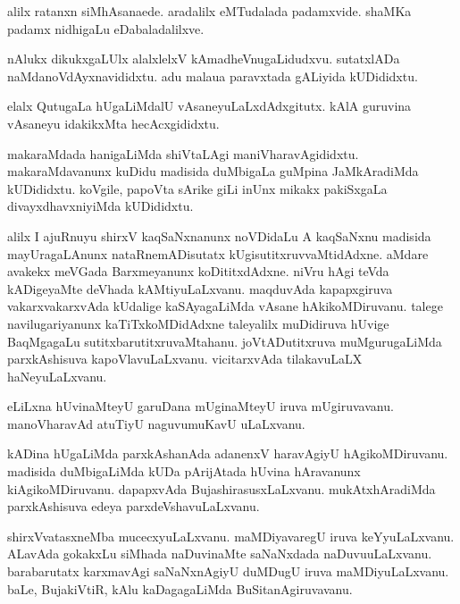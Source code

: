 \documentclass{article}
\begin{document}
\begin{mn}%
alilx ratanxn siMhAsanaede. aradalilx  eMTudalada padamxvide. shaMKa padamx nidhigaLu 
eDabaladalilxve.
\end{mn}

\begin{mn}%
nAlukx dikukxgaLUlx alalxlelxV kAmadheVnugaLidudxvu. sutatxlADa naMdanoVdAyxnavididxtu. 
adu malaua paravxtada gALiyida kUDididxtu.
\end{mn}

\begin{mn}%
elalx QutugaLa hUgaLiMdalU vAsaneyuLaLxdAdxgitutx. kAlA guruvina vAsaneyu idakikxMta 
hecAcxgididxtu.
\end{mn}

\begin{mn}%
makaraMdada hanigaLiMda shiVtaLAgi maniVharavAgididxtu. makaraMdavanunx kuDidu madisida 
duMbigaLa guMpina JaMkAradiMda kUDididxtu. koVgile, papoVta sArike giLi inUnx mikakx 
pakiSxgaLa divayxdhavxniyiMda kUDididxtu.
\end{mn}

\begin{mn}%
alilx I ajuRnuyu shirxV kaqSaNxnanunx noVDidaLu A kaqSaNxnu madisida mayUragaLAnunx 
nataRnemADisutatx kUgisutitxruvvaMtidAdxne. aMdare avakekx meVGada Barxmeyanunx 
koDititxdAdxne. niVru hAgi teVda kADigeyaMte deVhada kAMtiyuLaLxvanu. maqduvAda 
kapapxgiruva vakarxvakarxvAda kUdalige kaSAyagaLiMda vAsane hAkikoMDiruvanu. talege 
navilugariyanunx kaTiTxkoMDidAdxne taleyalilx muDidiruva hUvige BaqMgagaLu 
sutitxbarutitxruvaMtahanu. joVtADutitxruva muMgurugaLiMda parxkAshisuva kapoVlavuLaLxvanu. 
vicitarxvAda tilakavuLaLX haNeyuLaLxvanu.
\end{mn}

\begin{mn}%
eLiLxna hUvinaMteyU garuDana mUginaMteyU iruva mUgiruvavanu. manoVharavAd atuTiyU 
naguvumuKavU uLaLxvanu.
\end{mn}

\begin{mn}%
kADina hUgaLiMda parxkAshanAda adanenxV haravAgiyU hAgikoMDiruvanu. madisida duMbigaLiMda 
kUDa pArijAtada hUvina hAravanunx kiAgikoMDiruvanu. dapapxvAda BujashirasusxLaLxvanu. 
mukAtxhAradiMda parxkAshisuva edeya parxdeVshavuLaLxvanu. 
\end{mn}

\begin{mn}%
shirxVvatasxneMba mucecxyuLaLxvanu. maMDiyavaregU iruva keYyuLaLxvanu. ALavAda gokakxLu 
siMhada naDuvinaMte saNaNxdada naDuvuuLaLxvanu. barabarutatx karxmavAgi saNaNxnAgiyU 
duMDugU iruva maMDiyuLaLxvanu. baLe, BujakiVtiR, kAlu kaDagagaLiMda BuSitanAgiruvavanu.
\end{mn}
\end{document}
